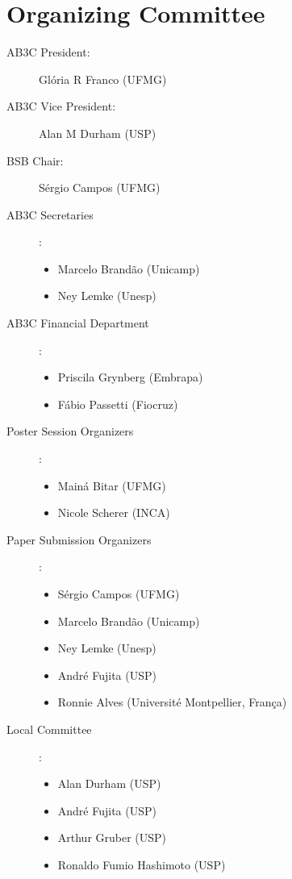 
\chapter{Organizing Committee}

\begin{description}

\item[AB3C President:] Glória R Franco (UFMG)

\item[AB3C Vice President:] Alan M Durham (USP)

\item[BSB Chair:] Sérgio Campos (UFMG)

\item[AB3C Secretaries]:

\begin{itemize}
 \item Marcelo Brandão (Unicamp) 
\item  Ney Lemke (Unesp)
\end{itemize}

\item[AB3C Financial Department]:

\begin{itemize}
\item Priscila Grynberg (Embrapa)
\item Fábio Passetti (Fiocruz)
\end{itemize}

\item[Poster Session Organizers]:

\begin{itemize}
\item Mainá Bitar (UFMG)
\item Nicole Scherer (INCA)
\end{itemize}

\item[Paper Submission Organizers]:  

\begin{itemize}
\item Sérgio Campos (UFMG)
\item Marcelo Brandão (Unicamp)
\item Ney Lemke (Unesp)
\item André Fujita (USP)
\item Ronnie Alves (Université Montpellier, França)
\end{itemize}

\item[Local Committee]:

\begin{itemize}
\item Alan Durham (USP)
\item André Fujita (USP)
\item Arthur Gruber (USP)
\item  Ronaldo Fumio Hashimoto (USP)
\end{itemize}
\end{description}
\newpage
